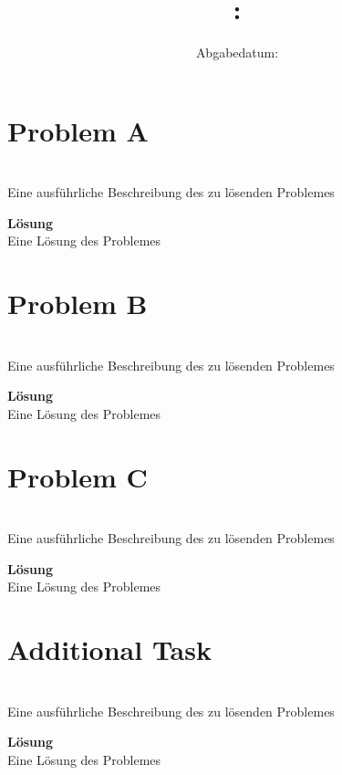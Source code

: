 \documentclass[oneside]{article}
\title{
    \textmd{\textbf{\hmwkSubject: \hmwkTitle}}
}
\author{\hmwkAuthor}
\date{Abgabedatum: \hmwkDueDate}
\begin{document}
\maketitle
\vspace{2cm}
\tableofcontents
\pagebreak


\section*{Problem A}
\\
Eine ausführliche Beschreibung des zu lösenden Problemes

\textbf{Lösung}\\
Eine Lösung des Problemes

\section*{Problem B}
\\
Eine ausführliche Beschreibung des zu lösenden Problemes

\textbf{Lösung}\\
Eine Lösung des Problemes

\section*{Problem C}
\\
Eine ausführliche Beschreibung des zu lösenden Problemes

\textbf{Lösung}\\
Eine Lösung des Problemes

\section*{Additional Task}
\\
Eine ausführliche Beschreibung des zu lösenden Problemes

\textbf{Lösung}\\
Eine Lösung des Problemes
\end{document}
